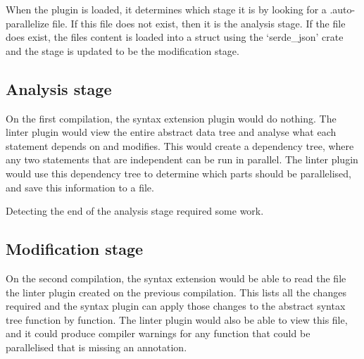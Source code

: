 \documentclass[conference]{IEEEtran}
\begin{document}
When the plugin is loaded, it determines which stage it is by looking for a .auto-parallelize file. If this file does not exist, then it is the analysis stage. If the file does exist, the files content is loaded into a struct using the `serde\_json' crate and the stage is updated to be the modification stage.

\subsection{Analysis stage}
On the first compilation, the syntax extension plugin would do nothing. The linter plugin would view the entire abstract data tree and analyse what each statement depends on and modifies. This would create a dependency tree, where any two statements that are independent can be run in parallel. The linter plugin would use this dependency tree to determine which parts should be parallelised, and save this information to a file.

Detecting the end of the analysis stage required some work.

\subsection{Modification stage}
On the second compilation, the syntax extension would be able to read the file the linter plugin created on the previous compilation. This lists all the changes required and the syntax plugin can apply those changes to the abstract syntax tree function by function. The linter plugin would also be able to view this file, and it could produce compiler warnings for any function that could be parallelised that is missing an annotation.


\printbibliography
\end{document}
